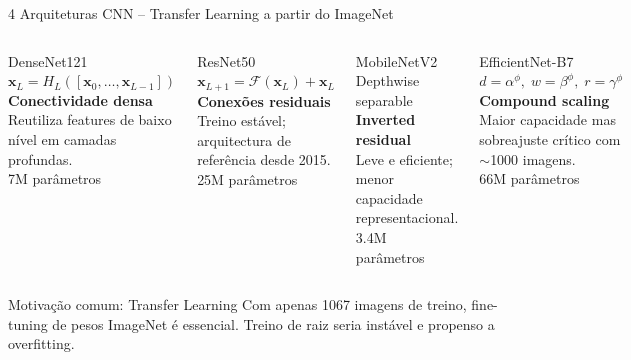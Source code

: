 \documentclass[aspectratio=169]{beamer}
\begin{document}
\begin{frame}{4 Arquiteturas CNN -- Transfer Learning a partir do ImageNet}
  \begin{columns}[T]
      \begin{block}{DenseNet121}
        $\mathbf{x}_L = H_L([\mathbf{x}_0,\ldots,\mathbf{x}_{L-1}])$\\[4pt]
        \textbf{Conectividade densa}\\
        Reutiliza features de baixo nível em camadas profundas.\\[4pt]
        7M parâmetros
      \end{block}
      \begin{block}{ResNet50}
        $\mathbf{x}_{L+1} = \mathcal{F}(\mathbf{x}_L)+\mathbf{x}_L$\\[4pt]
        \textbf{Conexões residuais}\\
        Treino estável; arquitectura de referência desde 2015.\\[4pt]
        25M parâmetros
      \end{block}
      \begin{block}{MobileNetV2}
        Depthwise separable\\
        \textbf{Inverted residual}\\
        Leve e eficiente; menor capacidade representacional.\\[4pt]
        3.4M parâmetros
      \end{block}
      \begin{block}{EfficientNet-B7}
        $d=\alpha^\phi,\; w=\beta^\phi,\; r=\gamma^\phi$\\[4pt]
        \textbf{Compound scaling}\\
        Maior capacidade mas sobreajuste crítico com $\sim$1000 imagens.\\[4pt]
        66M parâmetros
      \end{block}
  \end{columns}
  \vspace{0.6em}
  \begin{alertblock}{Motivação comum: Transfer Learning}
    Com apenas 1067 imagens de treino, fine-tuning de pesos ImageNet é essencial.
    Treino de raiz seria instável e propenso a overfitting.
  \end{alertblock}
\end{frame}
\end{document}

